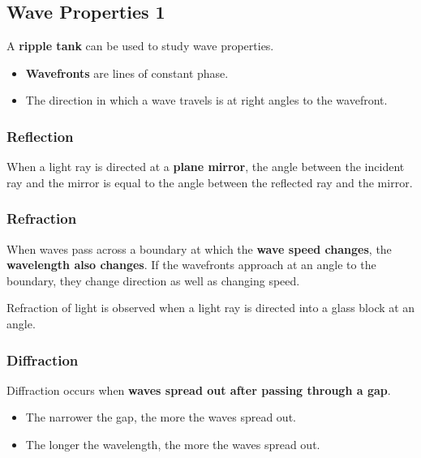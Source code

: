 \subsection{Wave Properties 1}

A \textbf{ripple tank} can be used to study wave properties.
\begin{itemize}
    \item \textbf{Wavefronts} are lines of constant phase.
    \item The direction in which a wave travels is at right angles to the wavefront.
\end{itemize}

\subsubsection*{Reflection}
When a light ray is directed at a \textbf{plane mirror}, the angle between the incident ray and the mirror is equal to the angle between the reflected ray and the mirror.

\subsubsection*{Refraction}

When waves pass across a boundary at which the \textbf{wave speed changes}, the \textbf{wavelength also changes}. If the wavefronts approach at an angle to the boundary, they change direction as well as changing speed.

Refraction of light is observed when a light ray is directed into a glass block at an angle.

\subsubsection*{Diffraction}
Diffraction occurs when \textbf{waves spread out after passing through a gap}.
\begin{itemize}
    \item The narrower the gap, the more the waves spread out.
    \item The longer the wavelength, the more the waves spread out.
\end{itemize}
